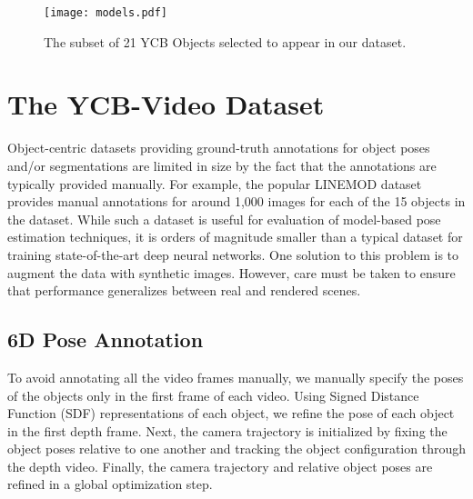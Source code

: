 \documentclass[conference]{IEEEtran}
\begin{document}

\begin{figure}
	\centering
	\texttt{[image: models.pdf]}
	\caption{The subset of 21 YCB Objects selected to appear in our dataset.}
	\label{fig:ycb}
	\vspace{-2mm}
\end{figure}

\section{The YCB-Video Dataset}

Object-centric datasets providing ground-truth annotations for object poses and/or segmentations are limited in size by the fact that the annotations are typically provided manually. For example, the popular LINEMOD dataset \cite{hinterstoisser2012model} provides manual annotations for around 1,000 images for each of the 15 objects in the dataset. While such a dataset is useful for evaluation of model-based pose estimation techniques, it is orders of magnitude smaller than a typical dataset for training state-of-the-art deep neural networks. One solution to this problem is to augment the data with synthetic images. However, care must be taken to ensure that performance generalizes between real and rendered scenes.

\subsection{6D Pose Annotation}

To avoid annotating all the video frames manually, we manually specify the poses of the objects only in the first frame of each video.  Using Signed Distance Function (SDF) representations of each object, we refine the pose of each object in the first depth frame. Next, the camera trajectory is initialized by fixing the object poses relative to one another and tracking the object configuration through the depth video. Finally, the camera trajectory and relative object poses are refined in a global optimization step.
\end{document}

